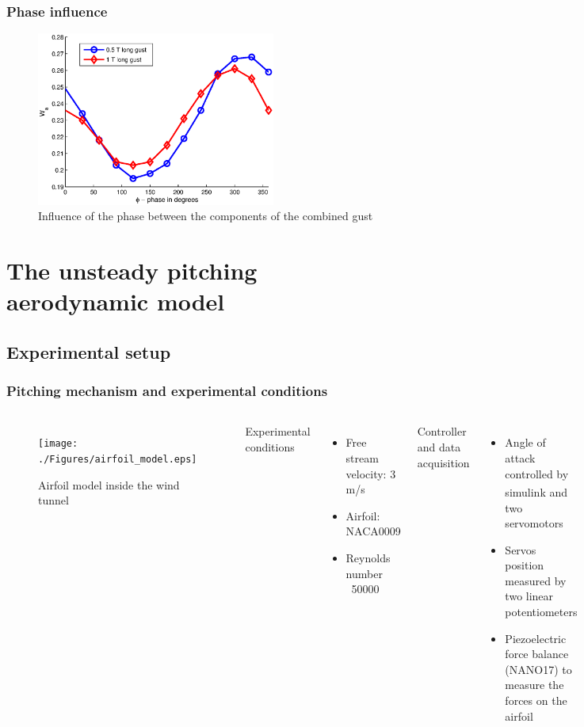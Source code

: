 \documentclass[compress]{beamer}
\begin{document}
\begin{frame}
  \frametitle{Phase influence}
\begin{figure}[ht]
  \begin{center}
    \includegraphics[width=0.7\textwidth]{./Figures/combined_gust_amplitude_vs_phase_LUT.eps}
  \end{center}
  \caption{Influence of the phase between the components of the combined gust}
  \label{fig:combined_amplitude_phase}
\end{figure}
\end{frame}


\section[GK model]{The unsteady pitching aerodynamic model}

\subsection{Experimental setup}

\begin{frame}[shrink]
  \frametitle{Pitching mechanism and experimental conditions}
  \begin{columns}
    \begin{figure}[h]
      \begin{center}
	\texttt{[image: ./Figures/airfoil\_model.eps]}
      \end{center}
      \caption{Airfoil model inside the wind tunnel}
    \end{figure}
    Experimental conditions
    \begin{itemize}
      \item Free stream velocity: 3 m/s
      \item Airfoil: NACA0009
      \item Reynolds number ~50000
    \end{itemize}
    Controller and data acquisition
    \begin{itemize}
      \item Angle of attack controlled by simulink\textsuperscript{\textregistered} and two servomotors 
      \item Servos position measured by two linear potentiometers
      \item Piezoelectric force balance (NANO17) to measure the forces on the airfoil
    \end{itemize}
  \end{columns}
\end{frame}
\end{document}
